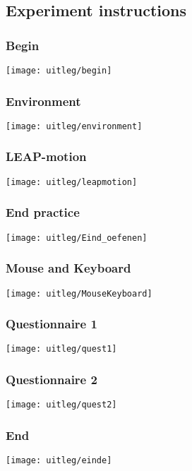 \subsection{Experiment instructions}\label{app:instructions}

\subsubsection{Begin}
\texttt{[image: uitleg/begin]}

\subsubsection{Environment}
\texttt{[image: uitleg/environment]}

\subsubsection{LEAP-motion}
\texttt{[image: uitleg/leapmotion]}

\subsubsection{End practice}
\texttt{[image: uitleg/Eind\_oefenen]}

\subsubsection{Mouse and Keyboard}
\texttt{[image: uitleg/MouseKeyboard]}

\subsubsection{Questionnaire 1}
\texttt{[image: uitleg/quest1]}

\subsubsection{Questionnaire 2}
\texttt{[image: uitleg/quest2]}

\subsubsection{End}
\texttt{[image: uitleg/einde]}